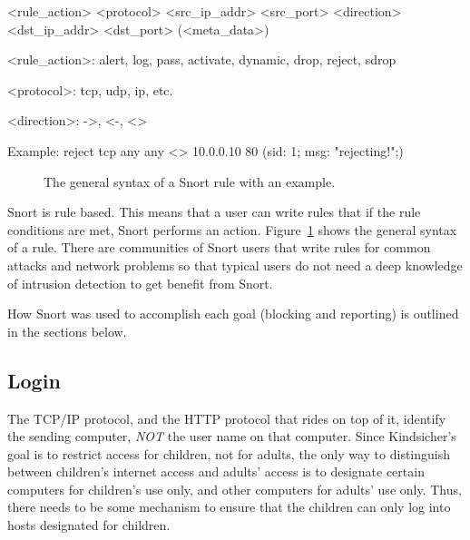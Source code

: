 \newcommand*\ifline[3]{%
        \ifthenelse{\value{VerbboxLineNo} = #1}{#2}{#3}}

\begin{verbbox}[\ifline{6}{\vspace{10pt}}{\ifline{10}{\vspace{3pt}}{\ifline{12}{\vspace{3pt}}{\ifline{14}{\vspace{10pt}}{}}}}]
<rule_action> <protocol>
    <src_ip_addr> <src_port>
    <direction>
    <dst_ip_addr> <dst_port>
    (<meta_data>)


<rule_action>: alert, log, pass, activate,
    dynamic, drop, reject, sdrop

<protocol>: tcp, udp, ip, etc.

<direction>: ->, <-, <>

Example:
reject tcp
    any any
    <>
    10.0.0.10 80
    (sid: 1; msg: "rejecting!";)

\end{verbbox}

\begin{figure}[!t]
    \centering
    \theverbbox
    \caption{The general syntax of a Snort rule with an example.}
    \label{fig:rule_syntax}
\end{figure}

Snort is rule based. This means that a user can write rules that if the rule
conditions are met, Snort performs an action. Figure~\ref{fig:rule_syntax}
shows the general syntax of a rule. There are communities of Snort users that
write rules for common attacks and network problems so that typical users do
not need a deep knowledge of intrusion detection to get benefit from Snort.


How Snort was used to accomplish each goal (blocking and reporting) is outlined
in the sections below.

\subsection{Login}

The TCP/IP protocol, and the HTTP protocol that rides on top of it, identify
the sending computer, \emph{NOT} the user name on that computer.  
% 
Since Kindsicher's goal is to restrict access for children, not for adults,
the only way to distinguish between children's internet access and adults'
access is to designate certain computers for children's use only, and other
computers for adults' use only.  
%
Thus, there needs to be some mechanism to ensure that the children can only
log into hosts designated for children.

